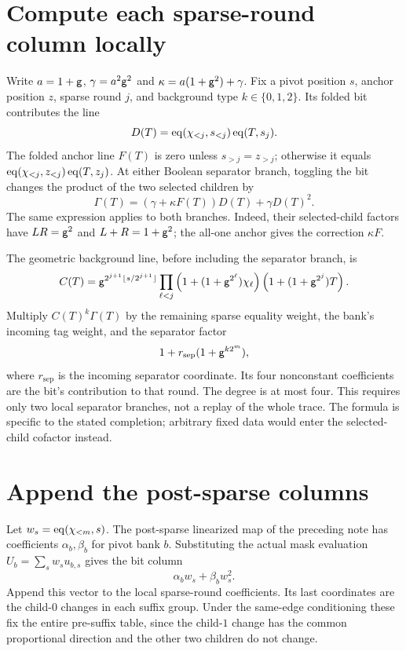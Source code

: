 \documentclass[11pt]{article}
\begin{document}
\section{Compute each sparse-round column locally}

Write $a=1+\mathsf{g}$, $\gamma=a^2\mathsf{g}^2$ and $\kappa=a(1+\mathsf{g}^2)+\gamma$. Fix a pivot position $s$, anchor position $z$, sparse round $j$, and background type $k\in\{0,1,2\}$. Its folded bit contributes the line
\[
 D(T)=\operatorname{eq}(\chi_{<j},s_{<j})\operatorname{eq}(T,s_j).
\]
The folded anchor line $F(T)$ is zero unless $s_{>j}=z_{>j}$; otherwise it equals $\operatorname{eq}(\chi_{<j},z_{<j})\operatorname{eq}(T,z_j)$. At either Boolean separator branch, toggling the bit changes the product of the two selected children by
\[
 \Gamma(T)=(\gamma+\kappa F(T))D(T)+\gamma D(T)^2.
\]
The same expression applies to both branches. Indeed, their selected-child factors have $LR=\mathsf{g}^2$ and $L+R=1+\mathsf{g}^2$; the all-one anchor gives the correction $\kappa F$.

The geometric background line, before including the separator branch, is
\[
 C(T)=\mathsf{g}^{2^{j+1}\lfloor s/2^{j+1}\rfloor}
 \prod_{\ell<j}\left(1+(1+\mathsf{g}^{2^\ell})\chi_\ell\right)
 \left(1+(1+\mathsf{g}^{2^j})T\right).
\]
Multiply $C(T)^k\Gamma(T)$ by the remaining sparse equality weight, the bank's incoming tag weight, and the separator factor
\[
 1+r_{\mathrm{sep}}(1+\mathsf{g}^{k2^m}),
\]
where $r_{\mathrm{sep}}$ is the incoming separator coordinate. Its four nonconstant coefficients are the bit's contribution to that round. The degree is at most four. This requires only two local separator branches, not a replay of the whole trace. The formula is specific to the stated completion; arbitrary fixed data would enter the selected-child cofactor instead.

\section{Append the post-sparse columns}

Let $w_s=\operatorname{eq}(\chi_{<m},s)$. The post-sparse linearized map of the preceding note has coefficients $\alpha_b,\beta_b$ for pivot bank $b$. Substituting the actual mask evaluation $U_b=\sum_s w_su_{b,s}$ gives the bit column
\[
 \alpha_bw_s+\beta_bw_s^2.
\]
Append this vector to the local sparse-round coefficients. Its last coordinates are the child-$0$ changes in each suffix group. Under the same-edge conditioning these fix the entire pre-suffix table, since the child-$1$ change has the common proportional direction and the other two children do not change.
\end{document}

